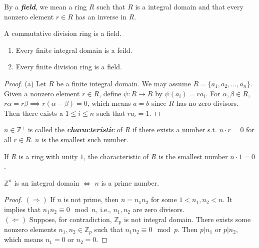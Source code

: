 \documentclass{article}
\begin{document}
\begin{multicols}{2}
\begin{mydefinition}
By a \textbf{\emph{field}}, we mean a ring $R$ such that $R$ is a integral domain and that every nonzero element $r\in R$ has an inverse in $R$.
\end{mydefinition}

\begin{myproposition}
A commutative division ring is a field.
\end{myproposition}

\begin{mytheorem}
\begin{enumerate}[label={(\alph*)}]
\item Every finite integral domain is a feild.
\item Every finite division ring is a field.
\end{enumerate}
\end{mytheorem}
\begin{proof}
(a) Let $R$ be a finite integral domain. We may assume $R=\{a_1,a_2,\dots,a_n\}$. Given a nonzero element $r\in R$, define $\psi: R\to R$ by $\psi(a_i)=ra_i$. For $\alpha,\beta \in R$, $r\alpha=r\beta\implies r(\alpha-\beta)=0$, which means $a=b$ since $R$ has no zero divisors. Then there exists a $1\leq i\leq n$ such that $ra_i=1$.
\end{proof}

\begin{mydefinition}
$n\in \mathbb{Z}^+$ is called the \textbf{\emph{characteristic}} of $R$ if there exists a number s.t. $n\cdot r=0$ for all $r\in R$. $n$ is the smallest such number.
\end{mydefinition}

\begin{mycorollary}
If $R$ is a ring with unity $1$, the characteristic of $R$ is the smallest number $n\cdot 1=0$.
\end{mycorollary}

\begin{mylemma}
$\mathbb{Z}^n$ is an integral domain $\iff$ $n$ is a prime number.
\end{mylemma}
\begin{proof}
$(\Rightarrow)$ If $n$ is not prime, then $n=n_1n_2$ for some $1<n_1,n_2<n$. It implies that $n_1n_2 \equiv 0 \mod n$, i.e., $n_1,n_2$ are zero divisors.\\
$(\Leftarrow)$ Suppose, for contradiction, $\mathbb{Z}_p$ is not integral domain. There exists some nonzero elements $n_1,n_2\in \mathbb{Z}_p$ such that $n_1n_2\equiv 0 \mod p$. Then $p|n_1$ or $p|n_2$, which means $n_1 = 0$ or $n_2 = 0$.
\end{proof}


\end{multicols}
\end{document}
